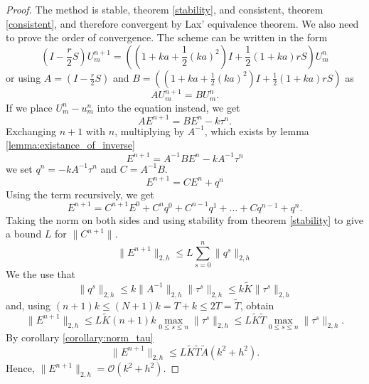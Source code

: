 \begin{proof}
    The method is stable, theorem \ref{stability}, and consistent, theorem \ref{consistent}, and therefore convergent by Lax' equivalence theorem. We also need to prove the order of convergence.
    The scheme can be written in the form
    $$\left(I - \frac{r}{2}S \right)U_{m}^{n+1} = \left( \left(1+ka+\frac{1}{2}(ka)^2\right)I + \frac{1}{2}\left(1+ka\right)rS\right)U_{m}^n$$
    or using $A = \left(I - \frac{r}{2}S \right)$ and $B = \left( \left(1+ka+\frac{1}{2}(ka)^2\right)I + \frac{1}{2}\left(1+ka\right)rS\right)$ as
    $$AU_{m}^{n+1} = BU_{m}^{n}.$$
    If we place $U_m^n - u_m^n$ into the equation instead, we get
    $$
    AE^{n+1} = BE^n - k\tau^n.
    $$
    Exchanging $n+1$ with $n$, multiplying by $A^{-1}$,
    which exists by lemma \ref{lemma:existance_of_inverse}
    $$E^{n+1} = A^{-1}BE^{n} -kA^{-1}\tau^n$$
    we set $q^{n}= -kA^{-1}\tau^n$ and $C=A^{-1}B$.
    $$E^{n+1} = CE^{n}+q^{n}$$
    Using the term recursively, we get
    $$
    E^{n+1} = C^{n+1}E^{0}+C^{n}q^0 + C^{n-1}q^1 + \dots + C q^{n-1} + q^{n}.
    $$
    Taking the norm on both sides and using stability from theorem \ref{stability} to give a bound $L$ for $\lVert C^{n+1} \lVert$.
    $$\lVert E^{n+1}\rVert_{2,h}  \leq L\sum_{s=0}^{n}\lVert q^s \rVert_{2,h}$$
    We the use that 
    $$\lVert q^s \rVert_{2,h} \leq k \lVert A^{-1} \rVert_{2,h} \lVert\tau^s \rVert_{2,h} \leq k \tilde{K} \lVert\tau^s \rVert_{2,h}$$
    and, using $(n+1)k\leq (N+1)k=T+k\le 2T = \tilde{T}$, obtain
    $$
    \lVert E^{n+1} \rVert_{2,h}
    \leq L \tilde{K}(n+1)k \max_{0\leq s \leq n} \lVert \tau^s\rVert_{2,h}
    \leq L \tilde{K}\tilde{T}\max_{0\leq s \leq n} \lVert \tau^s\rVert_{2,h}.
    $$
    By corollary \ref{corollary:norm_tau}
    $$
    \lVert E^{n+1} \rVert_{2, h} \leq L \tilde{K}\tilde{T}\tilde{A}(k^2+h^2).
    $$
  Hence, \( \lVert E^{n+1} \rVert_{2, h} = \mathcal{O}(k^2 + h^2)\).
\end{proof}

